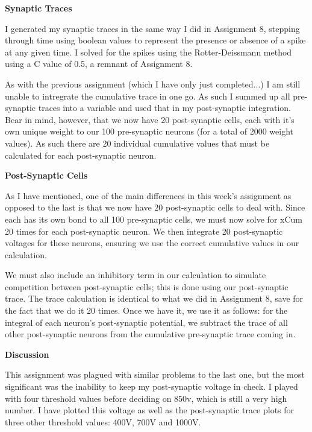 \documentclass[a4paper,12pt]{article}
\begin{document}
\vfil\eject

\bigskip
{\bf Synaptic Traces}
\bigskip

I generated my synaptic traces in the same way I did in Assignment 8, stepping through time using boolean values to represent the presence or absence of a spike at any given time. I solved for the spikes using the Rotter-Deissmann method using a C value of 0.5, a remnant of Assignment 8. 

\vspace{2mm}

As with the previous assignment (which I have only just completed...) I am still unable to intregrate the cumulative trace in one go. As such I summed up all pre-synaptic traces into a variable and used that in my post-synaptic integration. Bear in mind, however, that we now have 20 post-synaptic cells, each with it's own unique weight to our 100 pre-synaptic neurons (for a total of 2000 weight values). As such there are 20 individual cumulative values that must be calculated for each post-synaptic neuron. 

\bigskip
{\bf Post-Synaptic Cells}
\bigskip

As I have mentioned, one of the main differences in this week's assignment as opposed to the last is that we now have 20 post-synaptic cells to deal with. Since each has its own bond to all 100 pre-synaptic cells, we must now solve for xCum 20 times for each post-synaptic neuron. We then integrate 20 post-synaptic voltages for these neurons, ensuring we use the correct cumulative values in our calculation. 

\vspace{2mm}

We must also include an inhibitory term in our calculation to simulate competition between post-synaptic cells; this is done using our post-synaptic trace. The trace calculation is identical to what we did in Assignment 8, save for the fact that we do it 20 times. Once we have it, we use it as follows: for the integral of each neuron's post-synaptic potential, we subtract the trace of all other post-synaptic neurons from the cumulative pre-synaptic trace coming in. 

\bigskip
{\bf Discussion}
\bigskip

This assignment was plagued with similar problems to the last one, but the most significant was the inability to keep my post-synaptic voltage in check. I played with four threshold values before deciding on 850v, which is still a very high number. I have plotted this voltage as well as the post-synaptic trace plots for three other threshold values: 400V, 700V and 1000V. 
\end{document}
